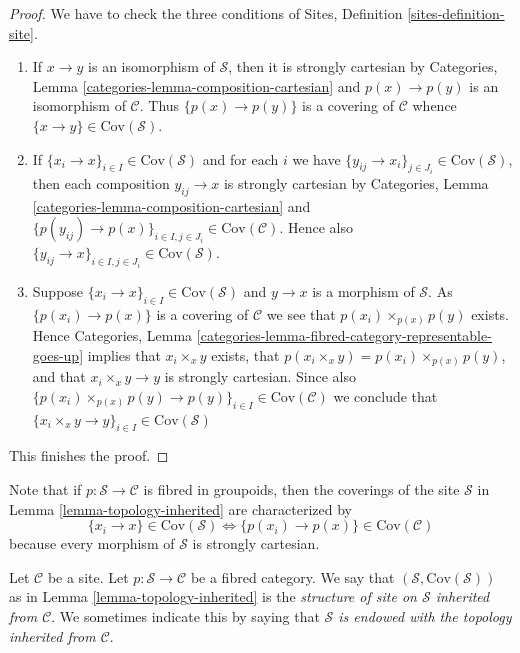 \begin{proof}
We have to check the three conditions of
Sites, Definition \ref{sites-definition-site}.
\begin{enumerate}
\item If $x \to y$ is an isomorphism of $\mathcal{S}$, then
it is strongly cartesian by
Categories, Lemma \ref{categories-lemma-composition-cartesian}
and $p(x) \to p(y)$ is an isomorphism of $\mathcal{C}$. Thus
$\{p(x) \to p(y)\}$ is a covering of $\mathcal{C}$ whence
$\{x \to y\} \in \text{Cov}(\mathcal{S})$.
\item If $\{x_i \to x\}_{i\in I} \in \text{Cov}(\mathcal{S})$ and for each
$i$ we have $\{y_{ij} \to x_i\}_{j\in J_i} \in \text{Cov}(\mathcal{S})$, then
each composition $y_{ij} \to x$ is strongly cartesian by
Categories, Lemma \ref{categories-lemma-composition-cartesian}
and $\{p(y_{ij}) \to p(x)\}_{i \in I, j\in J_i} \in \text{Cov}(\mathcal{C})$.
Hence also $\{y_{ij} \to x\}_{i \in I, j\in J_i} \in \text{Cov}(\mathcal{S})$.
\item Suppose $\{x_i \to x\}_{i\in I}\in \text{Cov}(\mathcal{S})$
and $y \to x$ is a morphism of $\mathcal{S}$. As $\{p(x_i) \to p(x)\}$
is a covering of $\mathcal{C}$ we see that $p(x_i) \times_{p(x)} p(y)$
exists. Hence
Categories, Lemma \ref{categories-lemma-fibred-category-representable-goes-up}
implies that $x_i \times_x y$ exists, that $p(x_i \times_x y) =
p(x_i) \times_{p(x)} p(y)$, and that $x_i \times_x y \to y$ is
strongly cartesian. Since also
$\{p(x_i) \times_{p(x)} p(y) \to p(y) \}_{i\in I} \in \text{Cov}(\mathcal{C})$
we conclude that
$\{x_i \times_x y \to y \}_{i\in I} \in \text{Cov}(\mathcal{S})$
\end{enumerate}
This finishes the proof.
\end{proof}

\noindent
Note that if $p : \mathcal{S} \to \mathcal{C}$ is fibred in groupoids, then
the coverings of the site $\mathcal{S}$ in
Lemma \ref{lemma-topology-inherited}
are characterized by
$$
\{x_i \to x\} \in \text{Cov}(\mathcal{S})
\Leftrightarrow
\{p(x_i) \to p(x)\} \in \text{Cov}(\mathcal{C})
$$
because every morphism of $\mathcal{S}$ is strongly cartesian.

\begin{definition}
\label{definition-topology-inherited}
Let $\mathcal{C}$ be a site. Let $p : \mathcal{S} \to \mathcal{C}$ be a
fibred category. We say that $(\mathcal{S}, \text{Cov}(\mathcal{S}))$ as in
Lemma \ref{lemma-topology-inherited}
is the {\it structure of site on $\mathcal{S}$ inherited from $\mathcal{C}$}.
We sometimes indicate this by saying that
{\it $\mathcal{S}$ is endowed with the topology inherited from $\mathcal{C}$}.
\end{definition}

